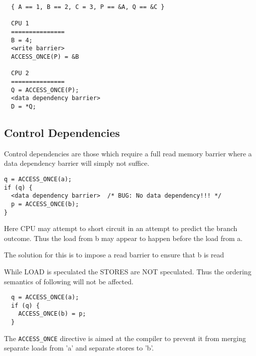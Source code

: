 \documentclass{article}
\begin{document}
\begin{lstlisting}
  { A == 1, B == 2, C = 3, P == &A, Q == &C }
  
  CPU 1
  ===============
  B = 4;
  <write barrier>
  ACCESS_ONCE(P) = &B

  CPU 2
  ===============	                     
  Q = ACCESS_ONCE(P);
  <data dependency barrier>
  D = *Q;  
\end{lstlisting}

\subsection{Control Dependencies}

Control dependencies are those which require a full read memory
barrier where a data dependency barrier will simply not suffice.

\begin{lstlisting}
q = ACCESS_ONCE(a);
if (q) {
  <data dependency barrier>  /* BUG: No data dependency!!! */
  p = ACCESS_ONCE(b);
}
\end{lstlisting}

Here CPU may attempt to short circuit in an attempt to predict the
branch outcome. Thus the load from b may appear to happen before the
load from a.

The solution for this is to impose a read barrier to ensure that b is
read

While LOAD is speculated the STORES are NOT speculated. Thus the
ordering semantics of following will not be affected.

\begin{lstlisting}
  q = ACCESS_ONCE(a);
  if (q) {
    ACCESS_ONCE(b) = p;
  }  
\end{lstlisting}


The \lstinline{ACCESS_ONCE} directive is aimed at the compiler to
prevent it from merging separate loads from 'a' and separate stores to
'b'.


\end{document}
